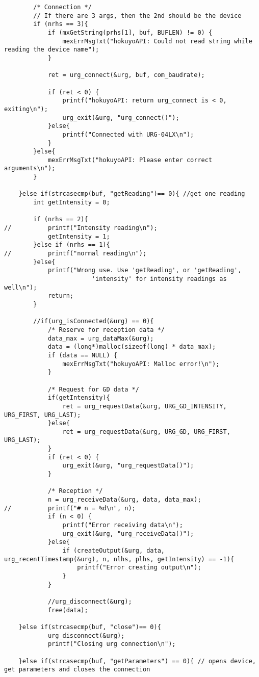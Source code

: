 \begin{lstlisting}
        /* Connection */
        // If there are 3 args, then the 2nd should be the device 
        if (nrhs == 3){
        	if (mxGetString(prhs[1], buf, BUFLEN) != 0) {
        		mexErrMsgTxt("hokuyoAPI: Could not read string while reading the device name");
        	}

        	ret = urg_connect(&urg, buf, com_baudrate);

        	if (ret < 0) {
        		printf("hokuyoAPI: return urg_connect is < 0, exiting\n");
        		urg_exit(&urg, "urg_connect()");
        	}else{
        		printf("Connected with URG-04LX\n");
        	}
        }else{
        	mexErrMsgTxt("hokuyoAPI: Please enter correct arguments\n");
        }

    }else if(strcasecmp(buf, "getReading")== 0){ //get one reading
    	int getIntensity = 0;

    	if (nrhs == 2){
//    		printf("Intensity reading\n");
    		getIntensity = 1;
    	}else if (nrhs == 1){
//    		printf("normal reading\n");
    	}else{
    		printf("Wrong use. Use 'getReading', or 'getReading', 
                        'intensity' for intensity readings as well\n");
    		return;
    	}

    	//if(urg_isConnected(&urg) == 0){
    		/* Reserve for reception data */
    		data_max = urg_dataMax(&urg);
    		data = (long*)malloc(sizeof(long) * data_max);
    		if (data == NULL) {
    			mexErrMsgTxt("hokuyoAPI: Malloc error!\n");
    		}

    		/* Request for GD data */
    		if(getIntensity){
    			ret = urg_requestData(&urg, URG_GD_INTENSITY, URG_FIRST, URG_LAST);
    		}else{
    			ret = urg_requestData(&urg, URG_GD, URG_FIRST, URG_LAST);
    		}
    		if (ret < 0) {
    			urg_exit(&urg, "urg_requestData()");
    		}

    		/* Reception */
    		n = urg_receiveData(&urg, data, data_max);
//    		printf("# n = %d\n", n);
    		if (n < 0) {
    			printf("Error receiving data\n");
    			urg_exit(&urg, "urg_receiveData()");
    		}else{
    			if (createOutput(&urg, data, urg_recentTimestamp(&urg), n, nlhs, plhs, getIntensity) == -1){
    				printf("Error creating output\n");
    			}
    		}

            //urg_disconnect(&urg);
    		free(data);

    }else if(strcasecmp(buf, "close")== 0){
    		urg_disconnect(&urg);
    		printf("Closing urg connection\n");

    }else if(strcasecmp(buf, "getParameters") == 0){ // opens device, get parameters and closes the connection


\end{lstlisting}
